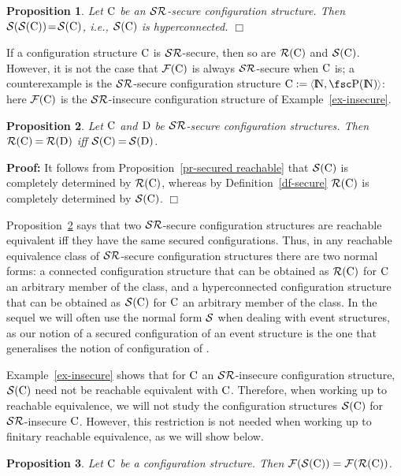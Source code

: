 \documentclass[twocolumn]{article}
\newtheorem{prop}{Proposition}[section]
\newenvironment{proposition}[1]{\begin{prop} \rm \label{pr-#1} }{\end{prop}}
\newenvironment{proof}{\begin{trivlist} \item[\hspace{\labelsep}\bf
Proof:]}{\hfill $\Box$\end{trivlist}}
\newcommand{\df}[1]{Definition~\ref{df-#1}}
\newcommand{\pr}[1]{Proposition~\ref{pr-#1}}
\newcommand{\ex}[1]{Example~\ref{ex-#1}}
\newcommand{\dl}[1]{\mbox{\rm I\hspace{-0.75mm}#1}}     \newcommand{\dc}[1]{\mbox{\rm {\raisebox{.4ex}{\makebox [0pt][l]{\hspace{.2em}\scriptsize $\mid$}}}#1}}
\newcommand{\IN}{\dl{N}}                        \newcommand{\IQ}{\dc{Q}}                        \newcommand{\IC}{\dc{C}}                        \newcommand{\IE}{\dl{E}}                        \newcommand{\IG}{\dc{G}}                        \newcommand{\fC}{{\cal C}}                      \newcommand{\fE}{{\cal E}}                      \newcommand{\fG}{{\cal G}}                      \newcommand{\fN}{{\cal N}}                      \newcommand{\fF}{{\cal F}}                      \newcommand{\fL}{{\cal L}}                      \newcommand{\fM}{{\cal M}}                      \newcommand{\fS}{{\cal S}}                      \newcommand{\fR}{{\cal R}}                      \newcommand{\eC}{{\rm C}}                       \newcommand{\eD}{{\rm D}}                       \newcommand{\eE}{{\rm E}}                       \newcommand{\eF}{{\rm F}}                       \newcommand{\eG}{{\rm G}}                       \newcommand{\eH}{{\rm H}}                       \newcommand{\eK}{{\rm K}}                       \newcommand{\eL}{{\rm L}}                       \newcommand{\eN}{{\rm N}}                       \newcommand{\eP}{{\rm P}}                       \newcommand{\eM}{{\rm M}}                       \newcommand{\eT}{{\rm T}}                       \newcommand{\fT}{{\cal T}}
\begin{document}
\begin{proposition}{reachable secured}
Let $\eC$ be an $\fS\fR$-secure configuration structure.
Then $\fS(\fS(\eC))\!=\!\fS(\eC)$, i.e., $\fS(\eC)$ is hyperconnected.
\hfill $\Box$
\end{proposition}
If a configuration structure $\eC$ is $\fS\fR$-secure, then so are
$\fR(\eC)$ and $\fS(\eC)$. However, it is not the case that $\fF(\eC)$
is always $\fS\fR$-secure when $\eC$ is; a counterexample is the $\fS\fR$-secure
configuration structure $\eC:=\tuple{\IN,\pow(\IN)}$: here $\fF(\eC)$
is the $\fS\fR$-insecure configuration structure of \ex{insecure}.

\begin{proposition}{secured equivalence}
Let $\eC$ and $\eD$ be $\fS\fR$-secure configuration structures.
Then $\fR(\eC) \mathbin= \fR(\eD)$ iff $\fS(\eC) \mathbin= \fS(\eD)$.
\end{proposition}
\begin{proof}
It follows from \pr{secured reachable} that $\fS(\eC)$ is completely
determined by $\fR(\eC)$, whereas by \df{secure} $\fR(\eC)$ is completely
determined by $\fS(\eC)$.
\end{proof}
\pr{secured equivalence} says that two $\fS\fR$-secure configuration structures are
reachable equivalent iff they have the same secured configurations.
Thus, in any reachable equivalence class of $\fS\fR$-secure configuration
structures there are two normal forms: a connected configuration
structure that can be obtained as $\fR(\eC)$ for $\eC$ an arbitrary
member of the class, and a hyperconnected configuration structure that
can be obtained as $\fS(\eC)$ for $\eC$ an arbitrary member of the
class. In the sequel we will often use the normal form $\fS$ when
dealing with event structures, as our notion of a secured
configuration of an event structure is the one that generalises the
notion of configuration of \cite{Wi87a,Wi89}.

\ex{insecure} shows that for $\eC$ an $\fS\fR$-insecure configuration
structure, $\fS(\eC)$ need not be reachable equivalent with $\eC$.
Therefore, when working up to reachable equivalence, we will not study
the configuration structures $\fS(\eC)$ for $\fS\fR$-insecure $\eC$.
However, this restriction is not needed when working up to finitary
reachable equivalence, as we will show below.

\begin{proposition}{finitary secured}
Let $\eC$ be a configuration structure.
Then $\fF(\fS(\eC)) = \fF(\fR(\eC))$.
\end{proposition}
\end{document}
